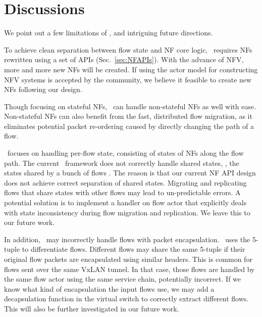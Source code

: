 \section{Discussions}
\label{sec:discussion}

We point out a few limitations of \nfactor, and intriguing future directions.

To achieve clean separation between flow state and NF core logic, \nfactor~requires NFs rewritten using a set of APIs (Sec.~\ref{sec:NFAPIs}). With the advance of NFV, more and more new NFs will be created. If using the actor model for constructing NFV systems is accepted by the community, we believe it feasible to create new NFs following our design. %

Though focusing on stateful NFs, %
\nfactor~can handle non-stateful NFs as well with ease. Non-stateful NFs can also benefit from the fast, distributed flow migration, as it eliminates potential packet re-ordering caused by directly changing the path of a flow.

\nfactor~focuses on handling per-flow state, consisting of states of NFs along the flow path. The current \nfactor~framework does not correctly handle shared states, \ie, the states shared by a bunch of flows \cite{bro}. The reason is that %
our current NF API design does not achieve correct separation of shared states. Migrating and replicating flows that share states with other flows may lead to un-predictable errors. A potential solution is to implement a handler on flow actor that explicitly deals with state inconsistency during flow migration and replication. We leave this to our future work.

In addition, \nfactor~may incorrectly handle flows with packet encapsulation. \nfactor~uses the 5-tuple to differentiate flows. Different flows may share the same 5-tuple if their original flow packets are encapsulated using similar headers. This is common for flows sent over the same VxLAN tunnel. In that case, those flows are handled by the same flow actor using the same service chain, potentially incorrect. If we know what kind of encapsulation the input flows use, we may add a decapsulation function in the virtual switch to correctly extract different flows. This will also be further investigated in our future work.
